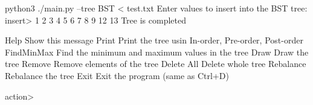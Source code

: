 

\begin{TcblistingMintedTerminal}
python3 ./main.py --tree BST < test.txt
Enter values to insert into the BST tree:
insert> 1 2 3 4 5 6 7 8 9 12 13
Tree is completed


    Help         Show this message
    Print        Print the tree usin In-order, Pre-order, Post-order
    FindMinMax   Find the minimum and maximum values in the tree
    Draw         Draw the tree
    Remove       Remove elements of the tree
    Delete All   Delete whole tree
    Rebalance    Rebalance the tree
    Exit         Exit the program (same as Ctrl+D)
    
action> 

\end{TcblistingMintedTerminal}